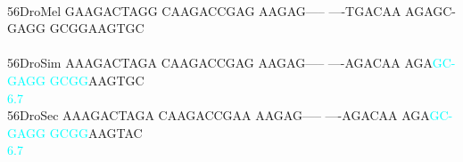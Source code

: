 \documentclass[11pt,twoside,reqno,a4paper]{article}
\begin{document}
{\\
56\hspace*{3\charwidth}DroMel	GAAGACTAGG	CAAGACCGAG	AAGAG-----	----TGACAA	AGAGC-GAGG	GCGGAAGTGC	\\
\hspace*{5\charwidth}\hspace*{7\charwidth}\hspace*{1\charwidth}\hspace*{1\charwidth}\hspace*{1\charwidth}\hspace*{1\charwidth}\hspace*{1\charwidth}\hspace*{1\charwidth}\\
56\hspace*{3\charwidth}DroSim	AAAGACTAGA	CAAGACCGAG	AAGAG-----	----AGACAA	AGA\textcolor{cyan}{G}\textcolor{cyan}{C}\textcolor{cyan}{-}\textcolor{cyan}{G}\textcolor{cyan}{A}\textcolor{cyan}{G}\textcolor{cyan}{G}	\textcolor{cyan}{G}\textcolor{cyan}{C}\textcolor{cyan}{G}\textcolor{cyan}{G}AAGTGC	\\
\hspace*{5\charwidth}\hspace*{7\charwidth}\hspace*{1\charwidth}\hspace*{1\charwidth}\hspace*{1\charwidth}\hspace*{1\charwidth}\hspace*{43\charwidth}\textcolor{cyan}{6.7}\hspace*{1\charwidth}\hspace*{1\charwidth}\\
56\hspace*{3\charwidth}DroSec	AAAGACTAGA	CAAGACCGAA	AAGAG-----	----AGACAA	AGA\textcolor{cyan}{G}\textcolor{cyan}{C}\textcolor{cyan}{-}\textcolor{cyan}{G}\textcolor{cyan}{A}\textcolor{cyan}{G}\textcolor{cyan}{G}	\textcolor{cyan}{G}\textcolor{cyan}{C}\textcolor{cyan}{G}\textcolor{cyan}{G}AAGTAC	\\
\hspace*{5\charwidth}\hspace*{7\charwidth}\hspace*{1\charwidth}\hspace*{1\charwidth}\hspace*{1\charwidth}\hspace*{1\charwidth}\hspace*{43\charwidth}\textcolor{cyan}{6.7}\hspace*{1\charwidth}\hspace*{1\charwidth}\\
}
\end{document}
